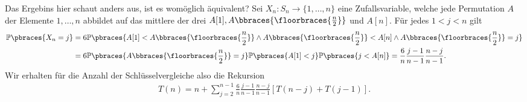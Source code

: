 \begin{solution}
	Das Ergebins hier schaut anders aus, ist es womöglich äquivalent? Sei $X_n: S_n \to \{1, \dots, n\}$ eine Zufallsvariable, welche jede Permutation $A$ der Elemente $1, \dots, n$ abbildet auf das mittlere der drei $A[1], A\bbraces{\floorbraces{\frac{n}{2}}}$ und $A[n]$. Für jedes $1 < j < n$ gilt
	\begin{align*}
		\mathbb{P}\pbraces{X_n = j} &= 6 \mathbb{P}\pbraces{A[1] < A\bbraces{\floorbraces{\frac{n}{2}}} \land A\bbraces{\floorbraces{\frac{n}{2}}} < A[n] \land A\bbraces{\floorbraces{\frac{n}{2}}} = j} \\
		&= 6 \mathbb{P}\pbraces{A\bbraces{\floorbraces{\frac{n}{2}}} = j} \mathbb{P}\pbraces{A[1] < j} \mathbb{P}\pbraces{j < A[n]} = \frac{6}{n}\frac{j - 1}{n - 1}\frac{n - j}{n - 1}.
	\end{align*}
	Wir erhalten für die Anzahl der Schlüsselvergleiche also die Rekursion
	\begin{align*}
		T(n) = n + \sum_{j=2}^{n-1} \frac{6}{n}\frac{j - 1}{n - 1}\frac{n - j}{n - 1}
		[T(n-j) + T(j - 1)].
	\end{align*}
\end{solution}
